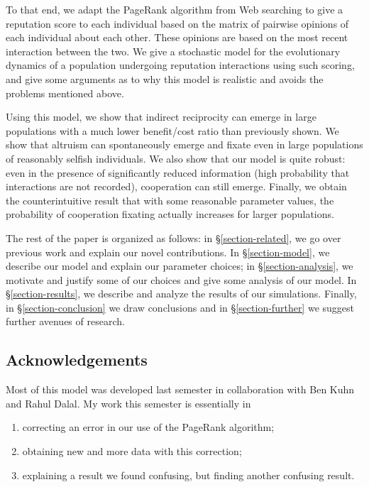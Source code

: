 \documentclass{amsart}
\begin{document}
To that end, we adapt the PageRank algorithm from Web searching to
give a reputation score to each individual based on the matrix of
pairwise opinions of each individual about each other. These opinions
are based on the most recent interaction between the two. We give a
stochastic model for the evolutionary dynamics of a population
undergoing reputation interactions using such scoring, and give some
arguments as to why this model is realistic and avoids the problems
mentioned above.

Using this model, we show that indirect reciprocity can emerge in
large populations with a much lower benefit/cost ratio than previously
shown. We show that altruism can spontaneously emerge and fixate even
in large populations of reasonably selfish individuals. We also show
that our model is quite robust: even in the presence of significantly
reduced information (high probability that interactions are not
recorded), cooperation can still emerge. Finally, we obtain the
counterintuitive result that with some reasonable parameter values,
the probability of cooperation fixating actually increases for larger
populations.

The rest of the paper is organized as follows: in
\S\ref{section-related}, we go over previous work and explain our
novel contributions. In \S\ref{section-model}, we describe our model
and explain our parameter choices; in \S\ref{section-analysis}, we
motivate and justify some of our choices and give some analysis of our
model. In \S\ref{section-results}, we describe and analyze the results
of our simulations. Finally, in \S\ref{section-conclusion} we draw
conclusions and in \S\ref{section-further} we suggest further avenues
of research.

\subsection{Acknowledgements}

Most of this model was developed last semester in collaboration with
Ben Kuhn and Rahul Dalal. My work this semester is essentially in
\begin{enumerate}
\item correcting an error in our use of the PageRank algorithm;
\item obtaining new and more data with this correction;
\item explaining a result we found confusing, but finding another
  confusing result.
\end{enumerate}
\end{document}
